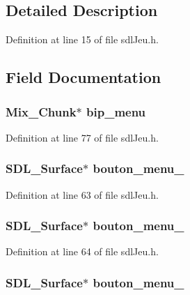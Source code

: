 \subsection{Detailed Description}


Definition at line 15 of file sdl\-Jeu.\-h.



\subsection{Field Documentation}
\hypertarget{structsdl_jeu_a58f8eda8c295fc531edf99fb867053a8}{
\subsubsection[{bip\-\_\-menu}]{\setlength{\rightskip}{0pt plus 5cm}Mix\-\_\-\-Chunk$\ast$ bip\-\_\-menu}}\label{structsdl_jeu_a58f8eda8c295fc531edf99fb867053a8}


Definition at line 77 of file sdl\-Jeu.\-h.

\hypertarget{structsdl_jeu_a064aa3c5aa4bb35c72af2e7ec4af4722}{
\subsubsection[{bouton\-\_\-menu\-\_\-1}]{\setlength{\rightskip}{0pt plus 5cm}S\-D\-L\-\_\-\-Surface$\ast$ bouton\-\_\-menu\-\_}}\label{structsdl_jeu_a064aa3c5aa4bb35c72af2e7ec4af4722}


Definition at line 63 of file sdl\-Jeu.\-h.

\hypertarget{structsdl_jeu_a529025a491485aef1616d286edff9ae7}{
\subsubsection[{bouton\-\_\-menu\-\_\-2}]{\setlength{\rightskip}{0pt plus 5cm}S\-D\-L\-\_\-\-Surface$\ast$ bouton\-\_\-menu\-\_}}\label{structsdl_jeu_a529025a491485aef1616d286edff9ae7}


Definition at line 64 of file sdl\-Jeu.\-h.

\hypertarget{structsdl_jeu_ad38d5f8cc0767da2a95b809b7ec5aa56}{
\subsubsection[{bouton\-\_\-menu\-\_\-3}]{\setlength{\rightskip}{0pt plus 5cm}S\-D\-L\-\_\-\-Surface$\ast$ bouton\-\_\-menu\-\_}}\label{structsdl_jeu_ad38d5f8cc0767da2a95b809b7ec5aa56}


